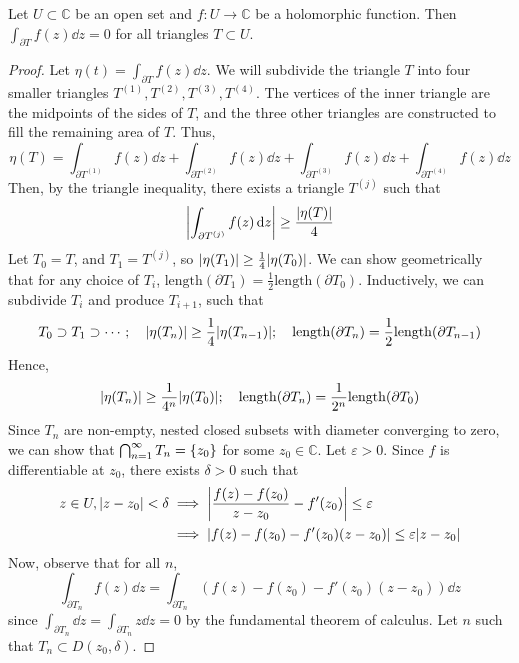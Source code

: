 \begin{theorem}
	Let \( U \subset \mathbb C \) be an open set and \( f \colon U \to \mathbb C \) be a holomorphic function.
	Then \( \int_{\partial T} f(z) \dd{z} = 0 \) for all triangles \( T \subset U \).
\end{theorem}
\begin{proof}
	Let \( \eta(t) = \int_{\partial T} f(z) \dd{z} \).
	We will subdivide the triangle \( T \) into four smaller triangles \( T^{(1)}, T^{(2)}, T^{(3)}, T^{(4)} \).
	The vertices of the inner triangle are the midpoints of the sides of \( T \), and the three other triangles are constructed to fill the remaining area of \( T \).
	Thus,
	\[ \eta(T) = \int_{\partial T^{(1)}} f(z) \dd{z} + \int_{\partial T^{(2)}} f(z) \dd{z} + \int_{\partial T^{(3)}} f(z) \dd{z} + \int_{\partial T^{(4)}} f(z) \dd{z} \]
	Then, by the triangle inequality, there exists a triangle \( T^{(j)} \) such that
	\[ \abs{\int_{\partial T^{(j)}} f(z) \dd{z}} \geq \frac{\abs{\eta(T)}}{4} \]
	Let \( T_0 = T \), and \( T_1 = T^{(j)} \), so \( \abs{\eta(T_1)} \geq \frac{1}{4}\abs{\eta(T_0)} \).
	We can show geometrically that for any choice of \( T_i \), \( \mathrm{length}(\partial T_1) = \frac{1}{2}\mathrm{length}(\partial T_0) \).
	Inductively, we can subdivide \( T_i \) and produce \( T_{i+1} \), such that
	\[ T_0 \supset T_1 \supset \cdots;\quad \abs{\eta(T_n)} \geq \frac{1}{4}\abs{\eta(T_{n-1})};\quad \mathrm{length}(\partial T_n) = \frac{1}{2} \mathrm{length}(\partial T_{n-1}) \]
	Hence,
	\[ \abs{\eta(T_n)} \geq \frac{1}{4^n}\abs{\eta(T_0)};\quad \mathrm{length}(\partial T_n) = \frac{1}{2^n} \mathrm{length}(\partial T_0) \]
	Since \( T_n \) are non-empty, nested closed subsets with diameter converging to zero, we can show that \( \bigcap_{n=1}^\infty T_n = \qty{z_0} \) for some \( z_0 \in \mathbb C \).
	Let \( \varepsilon > 0 \).
	Since \( f \) is differentiable at \( z_0 \), there exists \( \delta > 0 \) such that
	\begin{align*}
		z \in U, \abs{z - z_0} < \delta &\implies \abs{\frac{f(z) - f(z_0)}{z - z_0} - f'(z_0)} \leq \varepsilon \\
		&\implies \abs{f(z) - f(z_0) - f'(z_0)(z - z_0)} \leq \varepsilon \abs{z - z_0}
	\end{align*}
	Now, observe that for all \( n \),
	\[ \int_{\partial T_n} f(z) \dd{z} = \int_{\partial T_n} (f(z) - f(z_0) - f'(z_0)(z - z_0)) \dd{z} \]
	since \( \int_{\partial T_n} \dd{z} = \int_{\partial T_n} z \dd{z} = 0 \) by the fundamental theorem of calculus.
	Let \( n \) such that \( T_n \subset D(z_0, \delta) \).

\end{proof}
